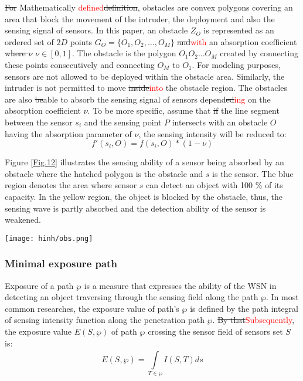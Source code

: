 \documentclass[final]{elsarticle}
\begin{document}
\sout{For} Mathematically \textcolor{red}{defined}\sout{definition}, obstacles are convex polygons covering an area that block the movement of the intruder, the deployment and also the sensing signal of sensors. In this paper, an obstacle $Z_O$ is represented as an ordered set of $2D$ points $ G_O = \{O_1, O_2,\ldots,O_M\}$ \sout{and}\textcolor{red}{with} an absorption coefficient \sout{where $\nu$} $\nu \in [0,1]$. The obstacle is the polygon $O_1 O_2\ldots O_M $ created by connecting these points consecutively and connecting $O_M$ to $O_1$. For modeling purposes, sensors are not allowed to be deployed within the obstacle area. Similarly, the intruder is not permitted to move \sout{inside}\textcolor{red}{into} the obstacle region. The obstacles are also \sout{be}able to absorb the sensing signal of sensors depend\sout{ed}\textcolor{red}{ing} on the absorption coefficient $\nu$. To be more specific, assume that \sout{if} the line segment between the sensor $s_i$ and the sensing point $ P $ intersects with an obstacle $O$ having the absorption parameter of $\nu$, the sensing intensity will be reduced to: 
\begin{equation}
\label{eq5}
f'(s_i,O) = f(s_i,O) * (1-\nu) 
\end{equation}

Figure \ref{Fig.12} illustrates the sensing ability of a sensor being absorbed by an obstacle where the hatched polygon is the obstacle and $ s $  is the sensor. The blue region denotes the area where sensor $ s $ can detect an object with 100 \% of its capacity. In the yellow region, the object is blocked by the obstacle, thus, the sensing wave is partly absorbed and the detection ability of the sensor is weakened.
\begin{figure*}[h]
	\centering
	\texttt{[image: hinh/obs.png]}
	\caption{Sensing ability of a sensor being absorbed by an obstacle}
	\label{Fig.12}       %
\end{figure*}
\subsubsection{Minimal exposure path}
Exposure of a path $ \wp $ is a measure that expresses the ability of the WSN in detecting an object traversing through the sensing field along the path $ \wp $. In most common researches, the exposure value of path's $ \wp $ is defined by the path integral of sensing intensity function along the penetration path $ \wp $. \sout{By that}\textcolor{red}{Subsequently}, the exposure value $  E(S,\wp ) $ of path $ \wp $ crossing the sensor field of sensors set $ S $ is:
\begin{equation}
\label{eq6}
E(S,\wp ) = \int\limits_{T \in \wp }^{} {I(S, T)} ds
\end{equation}
\end{document}
